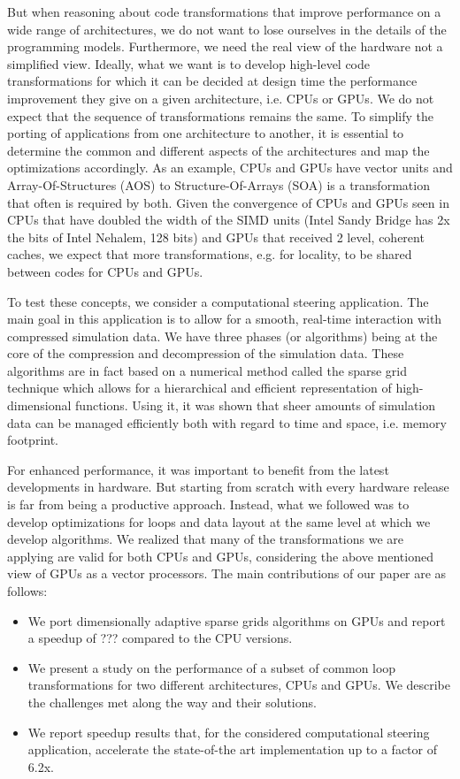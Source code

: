 But when reasoning about code transformations that improve performance on a wide
range of architectures, we do not want to lose ourselves in the details of the
programming models. Furthermore, we need the real view of the hardware not a
simplified view. Ideally, what we want is to develop high-level code
transformations for which it can be decided at design time the performance
improvement they give on a given architecture, i.e. CPUs or GPUs. We do not
expect that the sequence of transformations remains the same. To simplify the
porting of applications from one architecture to another, it is essential to
determine the common and different aspects of the architectures and map the
optimizations accordingly. As an example, CPUs and GPUs have vector units and
Array-Of-Structures (AOS) to Structure-Of-Arrays (SOA) is a transformation that
often is required by both. Given the convergence of CPUs and GPUs seen in CPUs
that have doubled the width of the SIMD units (Intel Sandy Bridge has 2x the
bits of Intel Nehalem, 128 bits) and GPUs that received 2 level, coherent
caches, we expect that more transformations, e.g. for locality, to be shared
between codes for CPUs and GPUs.

To test these concepts, we consider a computational steering application. The
main goal in this application is to allow for a smooth, real-time interaction
with compressed simulation data. We have three phases (or algorithms) being at the
core of the compression and decompression of the simulation data. These
algorithms are in fact based on a numerical method called the sparse grid
technique which allows for a hierarchical and efficient representation of
high-dimensional functions. Using it, it was shown that sheer amounts of
simulation data can be managed efficiently both with regard to time and space,
i.e. memory footprint.

For enhanced performance, it was important to benefit from the latest
developments in hardware. But starting from scratch with every hardware release
is far from being a productive approach. Instead, what we followed was to
develop optimizations for loops and data layout at the same level at which we
develop algorithms. We realized that many of the transformations we are applying
are valid for both CPUs and GPUs, considering the above mentioned view of GPUs
as a vector processors. The main contributions of our paper are as follows:

\begin{itemize}
  \item We port dimensionally adaptive sparse grids algorithms on GPUs and
  report a speedup of ??? compared to the CPU versions.
  \item We present a study on the performance of a subset of common loop
  transformations for two different architectures, CPUs and GPUs. We describe
  the challenges met along the way and their solutions.
  \item We report speedup results that, for the considered computational
  steering application, accelerate the state-of-the art implementation up to a
  factor of 6.2x.
\end{itemize}


